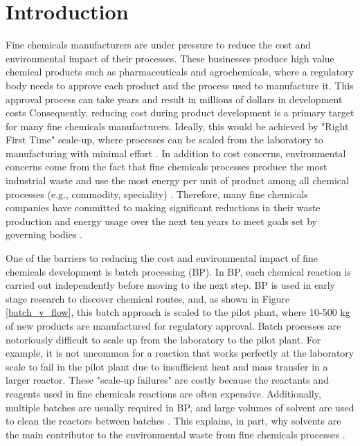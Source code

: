 \chapter{Introduction}\label{ch:introduction}

Fine chemicals manufacturers are under pressure to reduce the cost and environmental impact of their processes. These businesses produce high value chemical products such as pharmaceuticals and agrochemicals, where a regulatory body needs to approve each product and the process used to manufacture it. This approval process can take years and result in millions of dollars in development costs \cite{Prasad2017.} Consequently, reducing cost during product development is a primary target for many fine chemicals manufacturers. Ideally, this would be achieved by "Right First Time" scale-up, where processes can be scaled from the laboratory to manufacturing with minimal effort \cite{Poechlauer2013}. In addition to cost concerns, environmental concerns come from the fact that fine chemicals processes produce the most industrial waste and use the most energy per unit of product among all chemical processes (e.g., commodity, speciality) \cite{Sheldon2018}. Therefore, many fine chemicals companies have committed to making significant reductions in their waste production and energy usage over the next ten years to meet goals set by governing bodies \cite{BASF2020}.

One of the barriers to reducing the cost and environmental impact of fine chemicals development is batch processing (BP).  In BP, each chemical reaction is carried out independently before moving to the next step. BP is used in early stage research to discover chemical routes, and, as shown in Figure \ref{batch_v_flow}, this batch approach is scaled to the pilot plant, where 10-500 kg of new products are manufactured for regulatory approval. Batch processes are notoriously difficult to scale up from the laboratory to the pilot plant. For example, it is not uncommon for a reaction that works perfectly at the laboratory scale to fail in the pilot plant due to insufficient heat and mass transfer in a larger reactor. These "scale-up failures" are costly because the reactants and reagents used in fine chemicals reactions are often expensive. Additionally, multiple batches are usually required in BP, and large volumes of solvent are used to clean the reactors between batches \cite{Lee2016, Sheldon2018}. This explains, in part, why solvents are the main contributor to the environmental waste from fine chemicals processes \cite{Rogers2019}.

